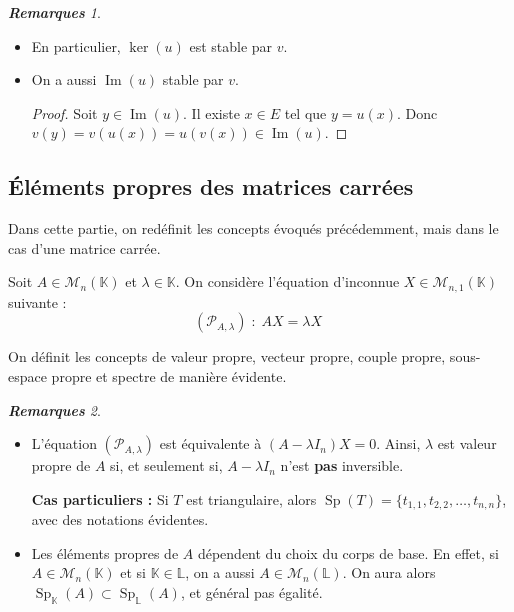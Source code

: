 \documentclass[12pt]{book}
\let\ensembleNombre\mathbb
\newcommand*\K{\ensuremath{\ensembleNombre{K}}}
\DeclareMathOperator{\Sp}{Sp}
\DeclareMathOperator{\Ima}{Im}
\theoremstyle{definition}
\theoremstyle{remark}
\newtheorem*{rems}{\textbf{Remarques}}
\begin{document}
	\begin{rems} \mbox{~}\\
	\begin{itemize}
	\item En particulier, $\ker(u)$ est stable par $v$.
	\item On a aussi $\Ima(u)$ stable par $v$.
		\begin{proof}
		Soit $y \in \Ima(u)$. Il existe $x \in E$ tel que $y = u(x)$. Donc $v(y) = v(u(x)) = u(v(x)) \in \Ima(u)$.
		\end{proof}
	\end{itemize}
	\end{rems}
	
	\subsection{Éléments propres des matrices carrées}
	Dans cette partie, on redéfinit les concepts évoqués précédemment, mais dans le cas d'une matrice carrée.
	
	Soit $A \in \mathcal M_n(\K)$ et $\lambda \in \K$. On considère l'équation d'inconnue $X \in \mathcal M_{n, 1}(\K)$ suivante :
	\[\boxed{(\mathcal P_{A,\lambda}) \; : \; AX = \lambda X \;}\]
	
	On définit les concepts de valeur propre, vecteur propre, couple propre, sous-espace propre et spectre de manière évidente.
	
	\begin{rems} \mbox{~}\\
	\begin{itemize}
	\item L'équation $(\mathcal P_{A, \lambda})$ est équivalente à $(A - \lambda I_n)X = 0$. Ainsi, $\lambda$ est valeur propre de $A$ si, et seulement si, $A - \lambda I_n$ n'est \textbf{pas} inversible.
	
	\textbf{Cas particuliers :} Si $T$ est triangulaire, alors $\Sp(T) = \lbrace t_{1,1}, t_{2,2}, \ldots, t_{n,n} \rbrace$, avec des notations évidentes.
	
	\item Les éléments propres de $A$ dépendent du choix du corps de base. En effet, si $A \in \mathcal M_n(\K)$ et si $\K \in \mathbb{L}$, on a aussi $A \in \mathcal M_n(\mathbb L)$. On aura alors $\Sp_{\K}(A) \subset \Sp_{\mathbb L}(A)$, et général pas égalité.
	\end{itemize}
	\end{rems}
	
\end{document}

